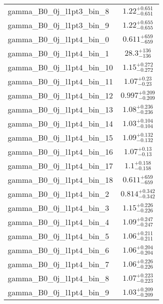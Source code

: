 \begin{tabular}{|l|c|}
gamma\_B0\_0j\_l1pt3\_bin\_8 & $1.22^{+0.651}_{-0.651}$ \\
gamma\_B0\_0j\_l1pt3\_bin\_9 & $1.22^{+0.655}_{-0.655}$ \\
gamma\_B0\_0j\_l1pt4\_bin\_0 & $0.611^{+659}_{-659}$ \\
gamma\_B0\_0j\_l1pt4\_bin\_1 & $28.3^{+136}_{-136}$ \\
gamma\_B0\_0j\_l1pt4\_bin\_10 & $1.15^{+0.272}_{-0.272}$ \\
gamma\_B0\_0j\_l1pt4\_bin\_11 & $1.07^{+0.23}_{-0.23}$ \\
gamma\_B0\_0j\_l1pt4\_bin\_12 & $0.997^{+0.209}_{-0.209}$ \\
gamma\_B0\_0j\_l1pt4\_bin\_13 & $1.08^{+0.236}_{-0.236}$ \\
gamma\_B0\_0j\_l1pt4\_bin\_14 & $1.03^{+0.104}_{-0.104}$ \\
gamma\_B0\_0j\_l1pt4\_bin\_15 & $1.09^{+0.132}_{-0.132}$ \\
gamma\_B0\_0j\_l1pt4\_bin\_16 & $1.07^{+0.13}_{-0.13}$ \\
gamma\_B0\_0j\_l1pt4\_bin\_17 & $1.1^{+0.158}_{-0.158}$ \\
gamma\_B0\_0j\_l1pt4\_bin\_18 & $0.611^{+659}_{-659}$ \\
gamma\_B0\_0j\_l1pt4\_bin\_2 & $0.814^{+0.342}_{-0.342}$ \\
gamma\_B0\_0j\_l1pt4\_bin\_3 & $1.15^{+0.226}_{-0.226}$ \\
gamma\_B0\_0j\_l1pt4\_bin\_4 & $1.09^{+0.247}_{-0.247}$ \\
gamma\_B0\_0j\_l1pt4\_bin\_5 & $1.06^{+0.211}_{-0.211}$ \\
gamma\_B0\_0j\_l1pt4\_bin\_6 & $1.06^{+0.204}_{-0.204}$ \\
gamma\_B0\_0j\_l1pt4\_bin\_7 & $1.06^{+0.226}_{-0.226}$ \\
gamma\_B0\_0j\_l1pt4\_bin\_8 & $1.07^{+0.223}_{-0.223}$ \\
gamma\_B0\_0j\_l1pt4\_bin\_9 & $1.03^{+0.209}_{-0.209}$ \\
\hline
\end{tabular}
